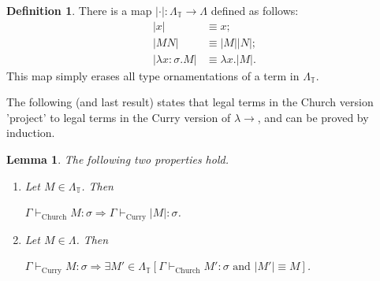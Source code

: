 \documentclass{llncs}
\newcommand{\lambdasystem}[0]{{\lambda}{\rightarrow}}
\theoremstyle{definition}
\newtheorem*{mydef*}{Definition}
\numberwithin{mydef}{subsection}
\theoremstyle{plain}
\newtheorem*{mylm*}{Lemma}
\theoremstyle{remark}
\begin{document}
	\begin{mydef*}
		There is a map $\left \vert \cdot \right \vert : \Lambda _{\mathbb{T}} \to \Lambda$	defined as follows:
		\begin{align*}
			\left \vert x \right \vert &\equiv x; \\
			\left \vert M N\right \vert &\equiv \left \vert M \right \vert \left \vert N \right \vert; \\
			\left \vert \lambda x {:} \sigma . M \right \vert &\equiv \lambda x . \left \vert M \right \vert.
		\end{align*}
		This map simply erases all type ornamentations of a term in $\Lambda _{\mathbb{T}}$.
	\end{mydef*}
	
	The following (and last result) states that legal terms in the Church version 'project' to legal terms in the Curry version of $\lambdasystem$, and can be proved by induction.
	
	\begin{mylm*}
		The following two properties hold.
		\begin{enumerate}
			\item Let $M \in \Lambda _{\mathbb{T}}$. Then
			\begin{center}
				$\Gamma \vdash _{\text{Church}} M : \sigma \Rightarrow \Gamma \vdash _{\text{Curry}} \left \vert M \right \vert : \sigma$.
			\end{center}
			\item Let $M \in \Lambda$. Then
			\begin{center}
				$\Gamma \vdash _{\text{Curry}} M : \sigma \Rightarrow \exists M ' \in \Lambda _{\mathbb{T}} \left[ \Gamma \vdash _{\text{Church}} M ' : \sigma \text{ and } \left \vert M ' \right \vert \equiv M \right]$.
			\end{center}
		\end{enumerate}
	\end{mylm*}
	
	
	
\end{document}
